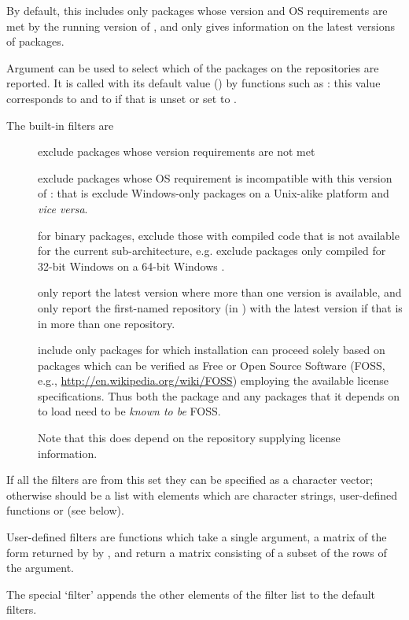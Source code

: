 \begin{Details}\relax
By default, this includes only packages whose version and OS
requirements are met by the running version of \R{}, and only gives
information on the latest versions of packages.

Argument  can be used to select which of the packages on the
repositories are reported.  It is called with its default value
() by functions such as : this value
corresponds to 
and to  if
that is unset or set to .

The built-in filters are
\begin{description}

\item[] exclude packages whose \R{} version
requirements are not met
\item[] exclude packages whose OS requirement is
incompatible with this version of \R{}: that is exclude
Windows-only packages on a Unix-alike platform
and \emph{vice versa}.
\item[] for binary packages, exclude those with
compiled code that is not available for the current
sub-architecture, e.g. exclude packages only compiled for 32-bit
Windows on a 64-bit Windows \R{}.
\item[] only report the latest version where more
than one version is available, and only report the first-named
repository (in ) with the latest version if that
is in more than one repository.
\item[] include only packages for which
installation can proceed solely based on packages which can be
verified as Free or Open Source Software (FOSS, e.g.,
\url{http://en.wikipedia.org/wiki/FOSS}) employing the available
license specifications.  Thus both the package and any packages
that it depends on to load need to be \emph{known to be} FOSS.

Note that this does depend on the repository supplying license
information.


\end{description}

If all the filters are from this set they can be specified as a
character vector; otherwise  should be a list with
elements which are character strings, user-defined functions or
 (see below).

User-defined filters are functions which take a single argument, a
matrix of the form returned by by , and
return a matrix consisting of a subset of the rows of the argument.

The special `filter'  appends the other
elements of the filter list to the default filters.
\end{Details}
